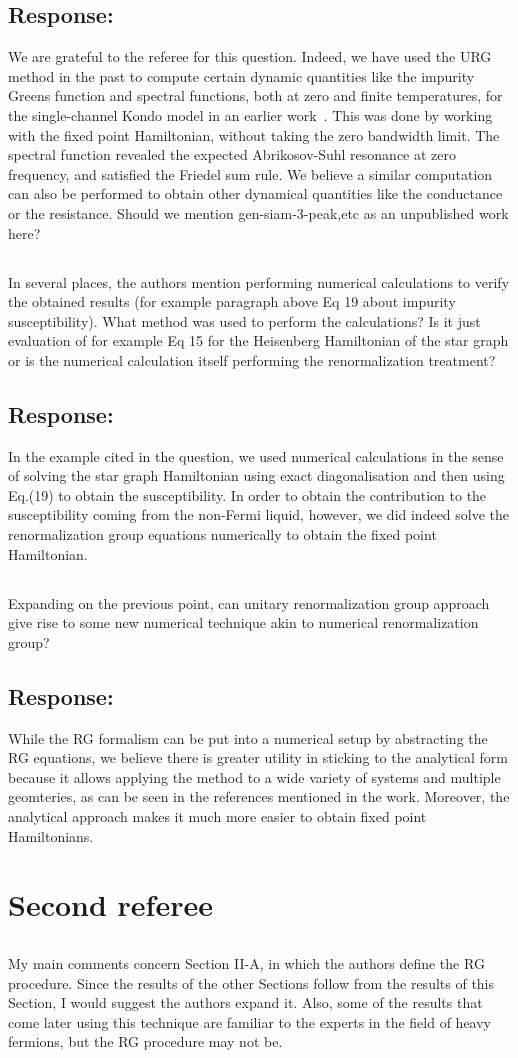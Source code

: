 \documentclass{article}
\newcommand{\response}[1]{{\color{blue}\subsection*{Response:}{#1}}}
\newcommand{\point}[1]{\subsection{}{#1}}
\begin{document}
\response{ We are grateful to the referee for this question. Indeed, we have used the URG method in the past to compute certain dynamic quantities like the impurity Greens function and spectral functions, both at zero and finite temperatures, for the single-channel Kondo model in an earlier work~\cite{kondo_urg}. This was done by working with the fixed point Hamiltonian, without taking the zero bandwidth limit. The spectral function revealed the expected Abrikosov-Suhl resonance at zero frequency, and satisfied the Friedel sum rule. We believe a similar  computation can also be performed to obtain other dynamical quantities like the conductance or the resistance. {\color{red}Should we mention gen-siam-3-peak,etc as an unpublished work here?}}

\point{
In several places, the authors mention performing numerical calculations to verify the obtained results (for example paragraph above Eq 19 about impurity susceptibility). What method was used to perform the calculations? Is it just evaluation of for example Eq 15 for the Heisenberg Hamiltonian of the star graph or is the numerical calculation itself performing the renormalization treatment?}

\response{ In the example cited in the question, we used numerical calculations in the sense of solving the star graph Hamiltonian using exact diagonalisation and then using Eq.(19) to obtain the susceptibility. In order to obtain the contribution to the susceptibility coming from the non-Fermi liquid, however, we did indeed solve the renormalization group equations numerically to obtain the fixed point Hamiltonian.}

\point{
Expanding on the previous point, can unitary renormalization group approach give rise to some new numerical technique akin to numerical renormalization group?}

\response{While the RG formalism can be put into a numerical setup by abstracting the RG equations, we believe there is greater utility in sticking to the analytical form because it allows applying the method to a wide variety of systems and multiple geomteries, as can be seen in the references mentioned in the work. Moreover, the analytical approach makes it much more easier to obtain fixed point Hamiltonians.}

\section{Second referee}

\point{
My main comments concern Section II-A, in which the authors define the RG procedure. Since the results of the other Sections follow from the results of this Section, I would suggest the authors expand it. Also, some of the results that come later using this technique are familiar to the experts in the field of heavy fermions, but the RG procedure may not be.}
\end{document}
